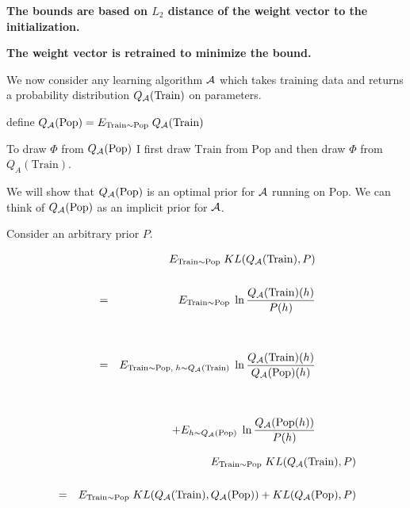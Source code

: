 {\vfill
{\bf The bounds are based on $L_2$ distance of the weight vector to the initialization.}

\vfill
{\bf The weight vector is retrained to minimize the bound.}



We now consider any learning algorithm ${\cal A}$ which takes training data
and returns a probability distribution $Q_{\cal A}(\mathrm{Train})$ on parameters.

\vfill
define $Q_{\cal A}(\mathrm{Pop}) = E_{\mathrm{Train} \sim \mathrm{Pop}}\;Q_{\cal A}(\mathrm{Train})$

\vfill
To draw $\Phi$ from $Q_{\cal A}(\mathrm{Pop})$ I first draw $\mathrm{Train}$ from $\mathrm{Pop}$ and then draw $\Phi$ from $Q_A(\mathrm{Train})$.

\vfill
We will show that $Q_{\cal A}(\mathrm{Pop})$ is an optimal prior for ${\cal A}$ running on $\mathrm{Pop}$.  We can think of $Q_{\cal A}(\mathrm{Pop})$
as an implicit prior for ${\cal A}$.


Consider an arbitrary prior $P$.

\vfill
\begin{eqnarray*}
  & & E_{\mathrm{Train}\sim\mathrm{Pop}}\;KL(Q_{\cal A}(\mathrm{Train}),P) \\
  \\
  & = & E_{\mathrm{Train}\sim\mathrm{Pop}}\;\ln \frac{Q_{\cal A}(\mathrm{Train})(h)}{P(h)}  \\
\\
\\
& = & E_{\mathrm{Train}\sim \mathrm{Pop},\;h \sim Q_{\cal A}(\mathrm{Train})}\;\ln \frac{Q_{\cal A}(\mathrm{Train})(h)}{Q_{\cal A}(\mathrm{Pop})(h)} \\
\\
\\
& & + E_{h \sim Q_{\cal A}(\mathrm{Pop})}\;\ln \frac{Q_{\cal A}(\mathrm{Pop}(h))}{P(h)}
\end{eqnarray*}


\begin{eqnarray*}
  & & E_{\mathrm{Train}\sim\mathrm{Pop}}\;KL(Q_{\cal A}(\mathrm{Train}),P) \\
\\
& = & E_{\mathrm{Train}\sim \mathrm{Pop}}\;KL(Q_{\cal A}(\mathrm{Train}),Q_{\cal A}(\mathrm{Pop})) + KL(Q_{\cal A}(\mathrm{Pop}),P)
\end{eqnarray*}

}
